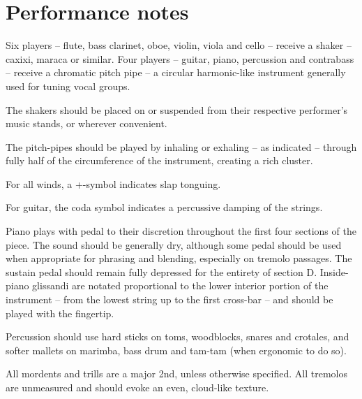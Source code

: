 \section{Performance notes}

Six players -- flute, bass clarinet, oboe, violin, viola and cello -- receive a
shaker -- caxixi, maraca or similar. Four players -- guitar, piano, percussion
and contrabass -- receive a chromatic pitch pipe -- a circular harmonic-like
instrument generally used for tuning vocal groups.

The shakers should be placed on or suspended from their respective performer's
music stands, or wherever convenient.

The pitch-pipes should be played by inhaling or exhaling -- as indicated --
through fully half of the circumference of the instrument, creating a rich
cluster.

For all winds, a +-symbol indicates slap tonguing.

For guitar, the coda symbol indicates a percussive damping of the strings.

Piano plays with pedal to their discretion throughout the first four sections
of the piece. The sound should be generally dry, although some pedal should be
used when appropriate for phrasing and blending, especially on tremolo
passages. The sustain pedal should remain fully depressed for the entirety of
section D. Inside-piano glissandi are notated proportional to the lower
interior portion of the instrument -- from the lowest string up to the first
cross-bar -- and should be played with the fingertip.

Percussion should use hard sticks on toms, woodblocks, snares and crotales, and
softer mallets on marimba, bass drum and tam-tam (when ergonomic to do so).

All mordents and trills are a major 2nd, unless otherwise specified. All
tremolos are unmeasured and should evoke an even, cloud-like texture.
